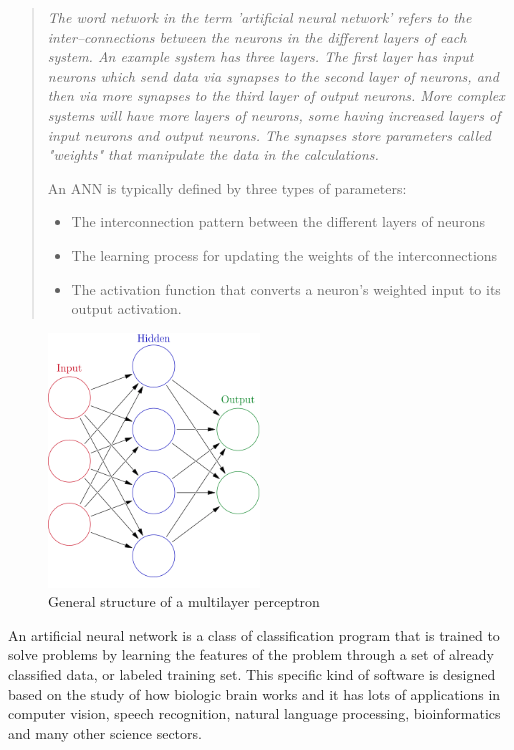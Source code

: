 \documentclass[a4paper,openany,oneside,12pt]{book}
\begin{document}
\begin{quote}
\em The word network in the term 'artificial neural network' refers to the inter–connections between the neurons in the different layers of each system. An example system has three layers. The first layer has input neurons which send data via synapses to the second layer of neurons, and then via more synapses to the third layer of output neurons. More complex systems will have more layers of neurons, some having increased layers of input neurons and output neurons. The synapses store parameters called "weights" that manipulate the data in the calculations.

An ANN is typically defined by three types of parameters:
\begin{itemize}
\item The interconnection pattern between the different layers of neurons
\item The learning process for updating the weights of the interconnections
\item The activation function that converts a neuron's weighted input to its output activation.
\cite{wiki:ann}
\end{itemize}
\end{quote}



\begin{figure}
\centering
\includegraphics[width=0.5\textwidth]{img/Colored_neural_network.png} 
\caption{General structure of a multilayer perceptron} \label{fig:neuralnet}
\end{figure}

An artificial neural network is a class of classification program that is trained to solve problems by learning the features of the problem through a set of already classified data, or labeled training set. This specific kind of software is designed based on the study of how  biologic brain works and it has lots of applications in computer vision, speech recognition, natural language processing, bioinformatics and many other science sectors.
\end{document}
